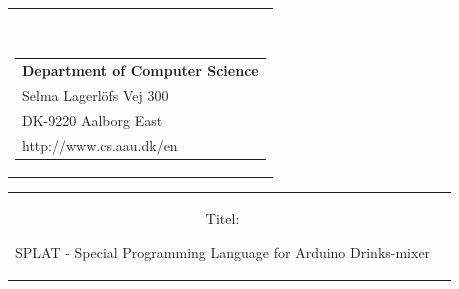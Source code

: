


% 

\begin{nopagebreak}
{\samepage
\hspace{8cm}
\begin{tabular}{r}
\parbox{\textwidth}{  
\hfill
\\
\parbox{8cm}{\begin{tabular}{l}
{\small \textbf{Department of Computer Science}}\\
{\small Selma Lagerlöfs Vej 300} \\
{\small DK-9220 Aalborg East} \\
{\small http://www.cs.aau.dk/en}
\end{tabular}}}

\end{tabular}
\hspace{0cm}

\vspace{-5cm}
\begin{tabular}{cc}
\parbox{7cm}{
\begin{description}

\item {Titel:} 

SPLAT - Special Programming Language for Arduino Drinks-mixer


\end{description}}
\end{tabular}}
\end{nopagebreak}
